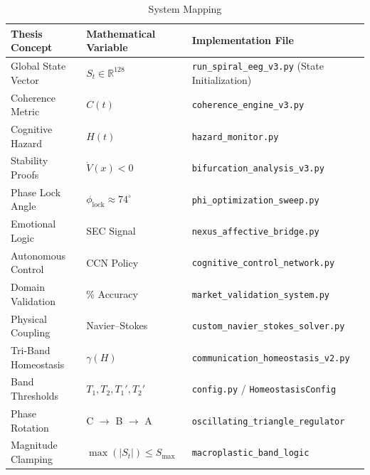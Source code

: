 \documentclass[12pt,a4paper]{report}
\begin{document}
\begin{table}[ht]
\centering
\caption{System Mapping}
\small

\begin{tabular}{
    >{\raggedright\arraybackslash}p{3.5cm}
    >{\raggedright\arraybackslash}p{3.5cm}
    >{\raggedright\arraybackslash}p{5cm}
}
\toprule
\textbf{Thesis Concept} &
\textbf{Mathematical Variable} &
\textbf{Implementation File} \\
\midrule

Global State Vector &
$S_t \in \mathbb{R}^{128}$ &
\texttt{run\_spiral\_eeg\_v3.py} (State Initialization) \\

Coherence Metric &
$C(t)$ &
\texttt{coherence\_engine\_v3.py} \\

Cognitive Hazard &
$H(t)$ &
\texttt{hazard\_monitor.py} \\

Stability Proofs &
$\dot{V}(x) < 0$ &
\texttt{bifurcation\_analysis\_v3.py} \\

Phase Lock Angle &
$\phi_{\text{lock}} \approx 74^\circ$ &
\texttt{phi\_optimization\_sweep.py} \\

Emotional Logic &
SEC Signal &
\texttt{nexus\_affective\_bridge.py} \\

Autonomous Control &
CCN Policy &
\texttt{cognitive\_control\_network.py} \\

Domain Validation &
95\% Accuracy &
\texttt{market\_validation\_system.py} \\

Physical Coupling &
Navier--Stokes &
\texttt{custom\_navier\_stokes\_solver.py} \\

Tri-Band Homeostasis &
$\gamma(H)$ &
\texttt{communication\_homeostasis\_v2.py} \\

Band Thresholds &
$T_1, T_2, T_1', T_2'$ &
\texttt{config.py} / \texttt{HomeostasisConfig} \\

Phase Rotation &
C $\rightarrow$ B $\rightarrow$ A &
\texttt{oscillating\_triangle\_regulator} \\

Magnitude Clamping &
$\max(|S_t|) \leq S_{\max}$ &
\texttt{macroplastic\_band\_logic} \\
\bottomrule
\end{tabular}

\end{table}
\endgroup
\end{document}
